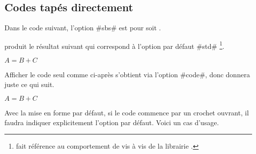 \documentclass[10pt, a4paper]{article}
\begin{document}
\subsection{Codes tapés directement}

\begin{bdocexa}
    Dans le code suivant, l'option \bdocinlatex#sbs# est pour  soit .

\end{bdocexa}




\begin{bdocexa}[À la suite]
     produit le résultat suivant qui correspond à l'option par défaut \bdocinlatex#std#
    \footnote{
         fait référence au comportement  de  vis à vis de la librairie .
    }.

    \begin{bdoclatex}
        $A = B + C$
    \end{bdoclatex}
\end{bdocexa}




\begin{bdocexa}
    Afficher le code seul comme ci-après s'obtient via l'option \bdocinlatex#code#, donc  donnera juste ce qui suit.

    \begin{bdoclatex}[code]
        $A = B + C$
    \end{bdoclatex}
\end{bdocexa}




\begin{bdocwarn}
    Avec la mise en forme par défaut, si le code commence par un crochet ouvrant, il faudra indiquer explicitement l'option par défaut. Voici un cas d'usage.

\end{bdocwarn}
\end{document}
